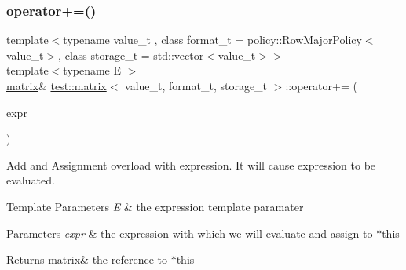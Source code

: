 \subsubsection{\texorpdfstring{operator+=()}{operator+=()}}
{\footnotesize\ttfamily template$<$typename value\+\_\+t , class format\+\_\+t  = policy\+::\+Row\+Major\+Policy$<$value\+\_\+t$>$, class storage\+\_\+t  = std\+::vector$<$value\+\_\+t$>$$>$ \\
template$<$typename E $>$ \\
\mbox{\hyperlink{classtest_1_1matrix}{matrix}}\& \mbox{\hyperlink{classtest_1_1matrix}{test\+::matrix}}$<$ value\+\_\+t, format\+\_\+t, storage\+\_\+t $>$\+::operator+= (\begin{DoxyParamCaption}\item[{\mbox{\hyperlink{classtest_1_1expression}{expression}}$<$ E $>$ const \&}]{expr }\end{DoxyParamCaption})\hspace{0.3cm}{\ttfamily [inline]}}



Add and Assignment overload with expression. It will cause expression to be evaluated. 


\begin{DoxyTemplParams}{Template Parameters}
{\em E} & the expression template paramater \\
\hline
\end{DoxyTemplParams}

\begin{DoxyParams}{Parameters}
{\em expr} & the expression with which we will evaluate and assign to $\ast$this \\
\hline
\end{DoxyParams}
\begin{DoxyReturn}{Returns}
matrix\& the reference to $\ast$this 
\end{DoxyReturn}
\mbox{\label{classtest_1_1matrix_a3bc463949a4ca9267e6ca9c23fabb9e8}} 

